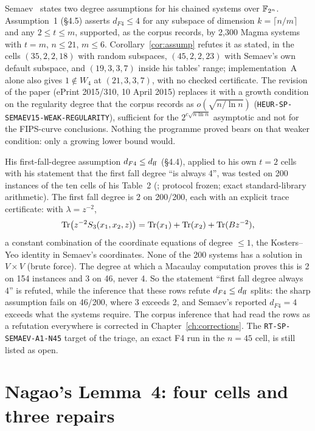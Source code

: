 Semaev~\cite{semaev2015} states two degree assumptions for his chained
systems over $\mathbb{F}_{2^n}$. Assumption~1 (\S4.5) asserts $d_{F4}\le4$ for any
subspace of dimension $k=\lceil n/m\rceil$ and any $2\le t\le m$, supported,
as the corpus records, by 2{,}300 Magma systems with $t=m$, $n\le21$,
$m\le6$. Corollary~\ref{cor:assump} refutes it as stated, in the cells
$(35,2,2,18)$ with random subspaces, $(45,2,2,23)$ with Semaev's own
default subspace, and $(19,3,3,7)$ inside his tables' range; implementation~A alone also
gives $1\notin W_4$ at $(21,3,3,7)$, with no checked certificate. The revision of the
paper (ePrint 2015/310, 10 April 2015) replaces it with a growth condition on
the regularity degree that the corpus records as
$o(\sqrt{n/\ln n})$ (\texttt{HEUR-SP-SEMAEV15-WEAK-REGULARITY}), sufficient
for the $2^{c\sqrt{n\ln n}}$ asymptotic and not for the FIPS-curve
conclusions. Nothing the programme proved bears on that weaker condition:
only a growing lower bound would.

His first-fall-degree assumption $d_{F4}\le d_{\rm ff}$ (\S4.4), applied to
his own $t=2$ cells with his statement that the first fall degree ``is always
4'', was tested on 200 instances of the ten cells of his Table~2
(; protocol frozen; exact
standard-library arithmetic). The first fall degree is 2 on 200/200, each
with an explicit trace certificate: with $\lambda=z^{-2}$,
\[
  \operatorname{Tr}\bigl(z^{-2}S_{3}(x_1,x_2,z)\bigr)
  =\operatorname{Tr}(x_1)+\operatorname{Tr}(x_2)+\operatorname{Tr}(Bz^{-2}),
\]
a constant combination of the coordinate equations of degree $\le1$, the
Kosters--Yeo identity in Semaev's coordinates. None of the 200 systems has a
solution in $V\times V$ (brute force). The degree at which a Macaulay
computation proves this is 2 on 154 instances and 3 on 46, never 4. So the
statement ``first fall degree always 4'' is refuted, while the inference that
these rows refute $d_{F4}\le d_{\rm ff}$ splits: the sharp assumption fails on
46/200, where 3 exceeds 2, and Semaev's reported $d_{F4}=4$ exceeds what the
systems require. The corpus inference that had read the rows as a refutation
everywhere is corrected in Chapter~\ref{ch:corrections}. The
\texttt{RT-SP-SEMAEV-A1-N45} target of the triage, an exact F4 run in the
$n=45$ cell, is still listed as open.

\section{Nagao's Lemma~4: four cells and three repairs}\label{sec:hd-nagao}

